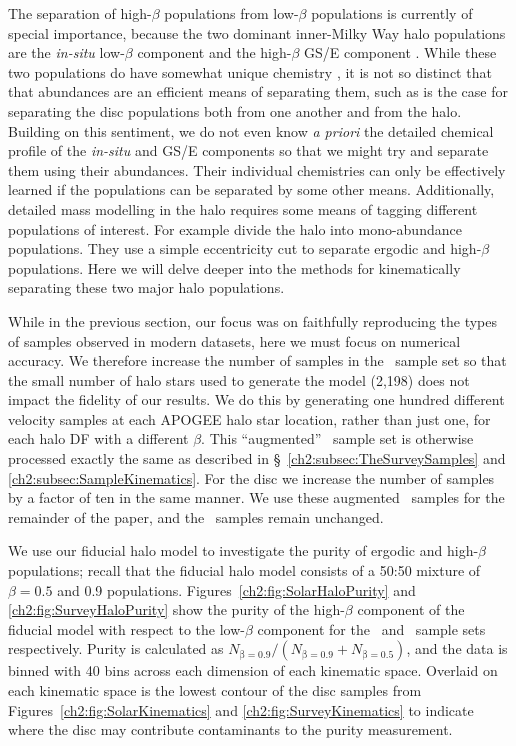 The separation of high-$\beta$ populations from low-$\beta$ populations is currently of special importance, because the two dominant inner-Milky Way halo populations are the \textit{in-situ} low-$\beta$ component and the high-$\beta$ GS/E component \parencite{belokurov18,helmi18,iorio21}. While these two populations do have somewhat unique chemistry \parencite{haywood18}, it is not so distinct that that abundances are an efficient means of separating them, such as is the case for separating the disc populations both from one another and from the halo. Building on this sentiment, we do not even know \textit{a priori} the detailed chemical profile of the \textit{in-situ} and GS/E components so that we might try and separate them using their abundances. Their individual chemistries can only be effectively learned if the populations can be separated by some other means. Additionally, detailed mass modelling in the halo requires some means of tagging different populations of interest. For example \textcite{mackereth20} divide the halo into mono-abundance populations. They use a simple eccentricity cut to separate ergodic and high-$\beta$ populations. Here we will delve deeper into the methods for kinematically separating these two major halo populations.

While in the previous section, our focus was on faithfully reproducing the types of samples observed in modern datasets, here we must focus on numerical accuracy. We therefore increase the number of samples in the \survey\ sample set so that the small number of halo stars used to generate the model (2,198) does not impact the fidelity of our results. We do this by generating one hundred different velocity samples at each APOGEE halo star location, rather than just one, for each halo DF with a different $\beta$. This ``augmented'' \survey\ sample set is otherwise processed exactly the same as described in \S~\ref{ch2:subsec:TheSurveySamples} and \ref{ch2:subsec:SampleKinematics}. For the disc we increase the number of samples by a factor of ten in the same manner. We use these augmented \survey\ samples for the remainder of the paper, and the \solar\ samples remain unchanged.

We use our fiducial halo model to investigate the purity of ergodic and high-$\beta$ populations; recall that the fiducial halo model consists of a 50:50 mixture of $\beta=0.5$ and 0.9 populations. Figures~\ref{ch2:fig:SolarHaloPurity} and \ref{ch2:fig:SurveyHaloPurity} show the purity of the high-$\beta$ component of the fiducial model with respect to the low-$\beta$ component for the \solar\ and \survey\ sample sets respectively. Purity is calculated as $N_\mathrm{\beta=0.9}/(N_\mathrm{\beta=0.9}+N_\mathrm{\beta=0.5})$, and the data is binned with 40 bins across each dimension of each kinematic space. Overlaid on each kinematic space is the lowest contour of the disc samples from Figures~\ref{ch2:fig:SolarKinematics} and \ref{ch2:fig:SurveyKinematics} to indicate where the disc may contribute contaminants to the purity measurement.


